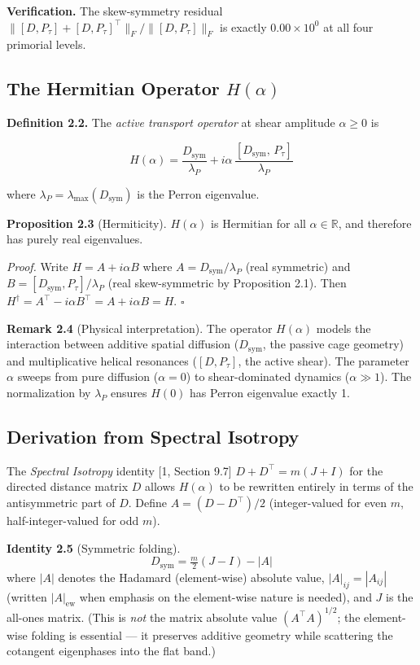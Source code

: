 \documentclass[11pt,letterpaper]{article}
\theoremstyle{definition}
\theoremstyle{remark}
\begin{document}
\textbf{Verification.} The skew-symmetry residual $\|[D,P_\tau] + [D,P_\tau]^\top\|_F / \|[D,P_\tau]\|_F$ is exactly $0.00 \times 10^{0}$ at all four primorial levels.

\subsection{The Hermitian Operator $H(\alpha)$}\label{the-hermitian-operator-halpha}

\textbf{Definition 2.2.} The \emph{active transport operator} at shear amplitude $\alpha \geq 0$ is

\[H(\alpha) = \frac{D_{\text{sym}}}{\lambda_P} + i\alpha \, \frac{[D_{\text{sym}},\, P_\tau]}{\lambda_P}\]

where $\lambda_P = \lambda_{\max}(D_{\text{sym}})$ is the Perron eigenvalue.

\textbf{Proposition 2.3} (Hermiticity). $H(\alpha)$ is Hermitian for all $\alpha \in \mathbb{R}$, and therefore has purely real eigenvalues.

\emph{Proof.} Write $H = A + i\alpha B$ where $A = D_{\text{sym}}/\lambda_P$ (real symmetric) and $B = [D_{\text{sym}}, P_\tau]/\lambda_P$ (real skew-symmetric by Proposition 2.1). Then $H^\dagger = A^\top - i\alpha B^\top = A + i\alpha B = H$. $\square$

\textbf{Remark 2.4} (Physical interpretation). The operator $H(\alpha)$ models the interaction between additive spatial diffusion ($D_{\text{sym}}$, the passive cage geometry) and multiplicative helical resonances ($[D, P_\tau]$, the active shear). The parameter $\alpha$ sweeps from pure diffusion ($\alpha = 0$) to shear-dominated dynamics ($\alpha \gg 1$). The normalization by $\lambda_P$ ensures $H(0)$ has Perron eigenvalue exactly 1.

\subsection{Derivation from Spectral Isotropy}\label{derivation-from-spectral-isotropy}

The \emph{Spectral Isotropy} identity [1, Section 9.7] $D + D^\top = m(J + I)$ for the directed distance matrix $D$ allows $H(\alpha)$ to be rewritten entirely in terms of the antisymmetric part of $D$. Define $A = (D - D^\top)/2$ (integer-valued for even $m$, half-integer-valued for odd $m$).

\textbf{Identity 2.5} (Symmetric folding). \[D_{\text{sym}} = \tfrac{m}{2}(J - I) - |A|\] where $|A|$ denotes the Hadamard (element-wise) absolute value, $|A|_{ij} = |A_{ij}|$ (written $|A|_{\text{ew}}$ when emphasis on the element-wise nature is needed), and $J$ is the all-ones matrix. (This is \emph{not} the matrix absolute value $(A^\top A)^{1/2}$; the element-wise folding is essential --- it preserves additive geometry while scattering the cotangent eigenphases into the flat band.)
\end{document}
